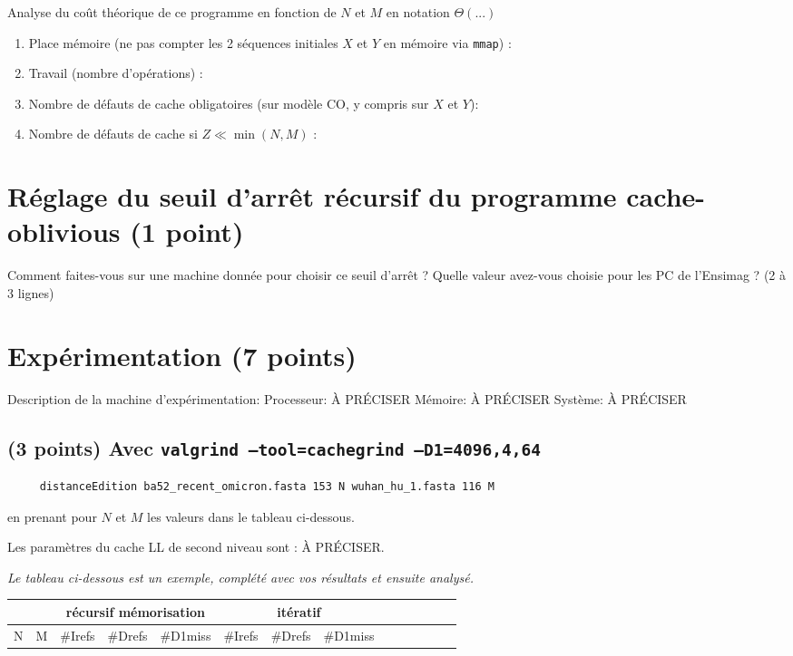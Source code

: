 \documentclass[10pt,a4paper]{article}
\begin{document}
{Analyse du coût théorique de ce programme en fonction de $N$ et $M$ en notation $\Theta(...)$
\begin{enumerate}
  \item Place mémoire (ne pas compter les 2 séquences initiales $X$ et $Y$ en mémoire via {\tt mmap}) :
  \item Travail (nombre d'opérations) :
  \item Nombre de défauts de cache obligatoires (sur modèle CO, y compris sur $X$ et $Y$):
  \item Nombre de défauts de cache si $Z \ll \min(N,M)$ :
\end{enumerate}

\section{Réglage du seuil d'arrêt récursif du programme cache-oblivious (1 point)}
Comment faites-vous sur une machine donnée pour choisir ce seuil d'arrêt ? Quelle valeur avez-vous choisie pour les PC de l'Ensimag ? (2 à 3 lignes)

\section{Expérimentation (7 points)}

Description de la machine d'expérimentation:
Processeur: À PRÉCISER
Mémoire: À PRÉCISER
Système: À PRÉCISER

\subsection{(3 points) Avec {\tt valgrind --tool=cachegrind --D1=4096,4,64}}
\begin{verbatim}
     distanceEdition ba52_recent_omicron.fasta 153 N wuhan_hu_1.fasta 116 M
\end{verbatim}
en prenant pour $N$ et $M$ les valeurs dans le tableau ci-dessous.

Les paramètres du cache LL de second niveau sont : À PRÉCISER.

{\em Le tableau ci-dessous est un exemple, complété avec vos résultats et ensuite analysé.}
\\
{\footnotesize
\begin{tabular}{|r|r||r|r|r||r|r|r||r|r|r||r|r|r||}
\hline
 \multicolumn{2}{|c||}{ } 
& \multicolumn{3}{c||}{récursif mémorisation}
& \multicolumn{3}{c||}{itératif}
\\ \hline
N & M 
& \#Irefs & \#Drefs & \#D1miss %
& \#Irefs & \#Drefs & \#D1miss %


\end{tabular}}}
\end{document}
